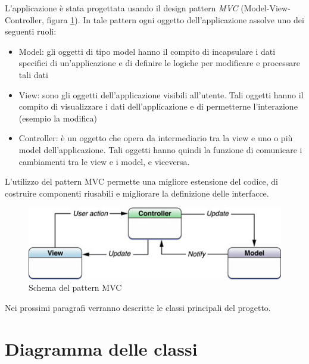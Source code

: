 L'applicazione è stata progettata usando il design pattern \emph{MVC} (Model-View-Controller, figura \ref{fig:mvc}). In tale pattern ogni oggetto dell'applicazione assolve uno dei seguenti ruoli:
\begin{itemize}
 \item Model: gli oggetti di tipo model hanno il compito di incapsulare i dati specifici di un'applicazione e di definire le logiche per modificare e processare tali dati
 \item View: sono gli oggetti dell'applicazione visibili all'utente. Tali oggetti hanno il compito di visualizzare i dati dell'applicazione e di permetterne l'interazione (esempio la modifica)
 \item Controller: è un oggetto che opera da intermediario tra la view e uno o più model dell'applicazione. Tali oggetti hanno quindi la funzione di comunicare i cambiamenti tra le view e i model, e viceversa.
\end{itemize}

L'utilizzo del pattern MVC permette una migliore estensione del codice, di costruire componenti riusabili e migliorare la definizione delle interfacce.

\begin{figure}[!htbp]
\centering
\includegraphics[scale=0.70]{architettura/mvc.png}
\caption{Schema del pattern MVC}
\label{fig:mvc}
\end{figure}

Nei prossimi paragrafi verranno descritte le classi principali del progetto.

\section{Diagramma delle classi}


